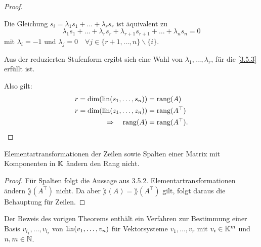 \begin{proof}
\begin{enumerate}
			Die Gleichung $ s_i = \lambda_1 s_1 + \ldots + \lambda_r s_r $ ist äquivalent zu
			\begin{equation}
				\lambda_1 s_1 + \ldots + \lambda_r s_r + \lambda_{r+1} s_{r+1} + \ldots + \lambda_n s_n = 0 \label{3.5.3}
			\end{equation} mit $ \lambda_i = -1 $ und $ \lambda_j = 0 \quad \forall j \in \{r+1,\ldots,n\} \backslash\{i\} $.

			Aus der reduzierten Stufenform ergibt sich eine Wahl von $ \lambda_1,\ldots, \lambda_r $, für die \eqref{3.5.3} erfüllt ist.
	\end{enumerate}
	Also gilt:
	\begin{align*}
		r = \dim(\operatorname{lin}(s_1,\ldots,s_n)) &= \operatorname{rang}(A) \\
		r = \dim(\operatorname{lin}(z_1,\ldots,z_n)) &= \operatorname{rang}(A^\top) \\
		\Rightarrow \quad \operatorname{rang}(A) &= \operatorname{rang}(A^\top). \qedhere
	\end{align*}
\end{proof}

\begin{klr}
	Elementartransformationen der Zeilen sowie Spalten einer Matrix mit Komponenten in $ \mathbb K $ ändern den Rang nicht.
\end{klr}
\begin{proof}
	Für Spalten folgt die Aussage aus 3.5.2. Elementartransformationen ändern $ \rang(A^\top) $ nicht. Da aber $ \rang(A) = \rang(A^\top) $ gilt, folgt daraus die Behauptung für Zeilen.
\end{proof}

\begin{bem}
	Der Beweis des vorigen Theorems enthält ein Verfahren zur Bestimmung einer Basis $ v_{i_1} , \ldots , v_{i_r} $ von $ \operatorname{lin}(v_1, \ldots, v_n) $ für Vektorsysteme $ v_1,\ldots,v_r $ mit $ v_i \in \mathbb K^m $ und $ n,m \in \mathbb N $.
\end{bem}

